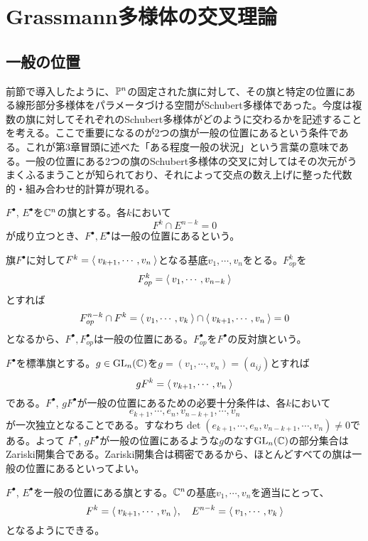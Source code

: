 \documentclass{ltjsreport}
\begin{document}
\section{Grassmann多様体の交叉理論}
\subsection{一般の位置}

前節で導入したように、$\mathbb{P}^n$の固定された旗に対して、その旗と特定の位置にある線形部分多様体をパラメータづける空間がSchubert多様体であった。今度は複数の旗に対してそれぞれのSchubert多様体がどのように交わるかを記述することを考える。ここで重要になるのが2つの旗が一般の位置にあるという条件である。これが第3章冒頭に述べた「ある程度一般の状況」という言葉の意味である。一般の位置にある2つの旗のSchubert多様体の交叉に対してはその次元がうまくふるまうことが知られており、それによって交点の数え上げに整った代数的・組み合わせ的計算が現れる。

\begin{defin}
  $F^\bullet$, $E^\bullet$を$\mathbb{C}^n$の旗とする。各$k$において
  \[
  F^k\cap E^{n-k}=0  
  \]
  が成り立つとき、$F^\bullet,E^\bullet$は一般の位置にあるという。
\end{defin}

\begin{eg}
  旗$F^\bullet$に対して$F^k=\langle\:v_{k+1},\cdots,v_n\:\rangle$となる基底$v_1,\cdots,v_n$をとる。$F^k_{op}$を
  \[
  F^k_{op}=\langle\:v_1,\cdots,v_{n-k}\:\rangle  
  \]
  とすれば
  \[
  F^{n-k}_{op}\cap F^k=\langle\:v_1,\cdots,v_k\:\rangle\cap\langle\:v_{k+1},\cdots,v_n\:\rangle  =0
  \]
  となるから、$F^\bullet,F^\bullet_{op}$は一般の位置にある。$F^\bullet_{op}$を$F^\bullet$の反対旗という。
\end{eg}

\begin{eg}
  $F^\bullet$を標準旗とする。$g\in \text{GL}_n(\mathbb{C})$を$g=(v_1,\cdots,v_n)=(a_{ij})$とすれば
  \[
  gF^k=\langle\:v_{k+1},\cdots,v_n\:\rangle
  \]
  である。$F^\bullet$, $gF^\bullet$が一般の位置にあるための必要十分条件は、各$k$において
  \[
  e_{k+1},\cdots,e_n,v_{n-k+1},\cdots,v_n  
  \]
  が一次独立となることである。すなわち$\det(e_{k+1},\cdots,e_n,v_{n-k+1},\cdots,v_n)\neq 0$である。よって
  $F^\bullet$, $gF^\bullet$が一般の位置にあるような$g$のなす$\text{GL}_n(\mathbb{C})$の部分集合はZariski開集合である。Zariski開集合は稠密であるから、ほとんどすべての旗は一般の位置にあるといってよい。
\end{eg}

\begin{prop}\label{flag_basis}
  $F^\bullet$, $E^\bullet$を一般の位置にある旗とする。$\mathbb{C}^n$の基底$v_1,\cdots,v_n$を適当にとって、
  \[
  F^k=\langle\:v_{k+1},\cdots,v_n\:\rangle, \quad E^{n-k}=\langle\:v_1,\cdots,v_k\:\rangle  
  \]
  となるようにできる。
\end{prop}
\end{document}
